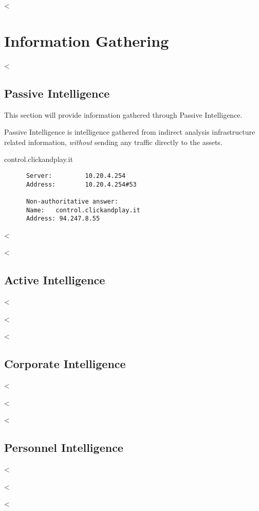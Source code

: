 

<%


\chapter{Information Gathering}\label{ch:infogath}

  <%

  \section {Passive Intelligence}\label{sec:passiveint}

    This section will provide information gathered through Passive Intelligence.

    Passive Intelligence is intelligence gathered from indirect analysis
    infrastructure related information, \textit{without} sending any traffic
    directly to the assets.

    control.clickandplay.it

    \begin{verbatim}
      Server:         10.20.4.254
      Address:        10.20.4.254#53

      Non-authoritative answer:
      Name:   control.clickandplay.it
      Address: 94.247.8.55
    \end{verbatim}

  <%

  <%

  \section {Active Intelligence}\label{sec:activeint}

    <%

  <%

  <%

  \section {Corporate Intelligence}\label{sec:corporateint}

    <%

  <%

  <%

  \section {Personnel Intelligence}\label{sec:personnelint}

    <%

  <%


<%
